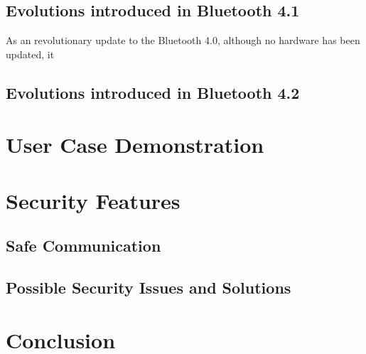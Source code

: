 \documentclass{cseminar}
\begin{document}
\subsection{Evolutions introduced in Bluetooth 4.1}
As an revolutionary update to the Bluetooth 4.0, although no hardware has been updated, it 

\subsection{Evolutions introduced in Bluetooth 4.2}

\section{User Case Demonstration}


\section{Security Features}

\subsection{Safe Communication}

\subsection{Possible Security Issues and Solutions}
\section{Conclusion}





\end{document}
